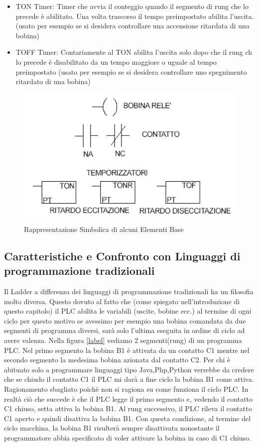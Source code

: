 \documentclass[12pt, a4paper, oneside]{book}
\begin{document}
\begin{itemize}
	\item TON Timer: Timer che avvia il conteggio quando il segmento di rung che lo precede è abilitato. Una volta trascorso il tempo preimpostato abilita l'uscita.
	(usato per esempio se si desidera controllare una accensione ritardata di una bobina)
	
	\item TOFF Timer: Contariamente al TON abilita l'uscita solo dopo che il rung ch lo precede è disabilitato da un tempo maggiore o uguale al tempo preimpostato (usato per esempio se si desidera controllare uno spegnimento ritardato di una bobina)
	
	
\end{itemize}

	\begin{figure}[H]
	\centering
	\includegraphics[width=12cm]{Immagini/LADELE}
	\label{L}
	\caption{Rappresentazione Simbolica di alcuni Elementi Base}
\end{figure}


\subsection{Caratteristiche e Confronto con Linguaggi di programmazione tradizionali}
	Il Ladder a differenza dei linguaggi di programmazione tradizionali ha un filosofia molto diversa. Questo dovuto al fatto che (come spiegato nell'introduzione di questo capitolo) il PLC abilita le variabili (uscite, bobine ecc.) al termine di ogni ciclo per questo motivo se avessimo per esempio  
	una bobina comandata da due segmenti di programma diversi, sarà solo l'ultima eseguita in ordine di ciclo ad avere valenza.
	Nella figura \ref{label} vediamo 2 segmenti(rung) di un programma PLC. Nel primo segmento la bobina B1 è attivata da un contatto C1 mentre nel secondo segmento la medesima bobina azionata dal contatto C2. Per chi è abituato solo a programmare linguaggi tipo Java,Php,Python verrebbe da credere che se chiudo il contatto C1 il PLC mi darà a fine ciclo la bobina B1 come attiva.
	Ragionamento sbagliato poichè non si ragiona su come funziona il ciclo PLC.
	In realtà ciò che succede è che il PLC legge il primo segmento e, vedendo il contatto C1 chiuso, setta attiva la bobina B1. Al rung successivo, il PLC rileva il contatto C1 aperto e quindi disattiva la bobina B1. Con questa condizione, al termine del ciclo macchina, la bobina B1 risulterà sempre disattivata nonostante il programmatore abbia specificato di voler attivare la bobina in caso di C1 chiuso.
	
\end{document}
